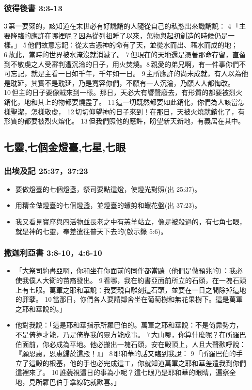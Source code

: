 \subsubsection{彼得後書 3:3-13}
 3 第一要緊的，該知道在末世必有好譏誚的人隨從自己的私慾出來譏誚說： 4 「主要降臨的應許在哪裡呢？因為從列祖睡了以來，萬物與起初創造的時候仍是一樣。」 5 他們故意忘記：從太古憑神的命有了天，並從水而出、藉水而成的地； 6 故此，當時的世界被水淹沒就消滅了。 7 但現在的天地還是憑著那命存留，直留到不敬虔之人受審判遭沉淪的日子，用火焚燒。8 親愛的弟兄啊，有一件事你們不可忘記，就是主看一日如千年，千年如一日。 9 主所應許的尚未成就，有人以為他是耽延，其實不是耽延，乃是寬容你們，不願有一人沉淪，乃願人人都悔改。 10 但主的日子要像賊來到一樣。那日，天必大有響聲廢去，有形質的都要被烈火銷化，地和其上的物都要燒盡了。 11 這一切既然都要如此銷化，你們為人該當怎樣聖潔，怎樣敬虔， 12 切切仰望神的日子來到！在\underline{那日}，天被火燒就銷化了，有形質的都要被烈火熔化。 13 但我們照他的應許，盼望新天新地，有義居在其中。






\subsection{七靈,七個金燈臺,七星,七眼}
\subsubsection{出埃及記 25:37，37:23}
\begin{itemize} 
\itemsep-.25em
\item 要做燈臺的七個燈盞，祭司要點這燈，使燈光對照(出 25:37)。
\item 用精金做燈臺的七個燈盞，並燈臺的蠟剪和蠟花盤(出 37:23)。
\item 我又看見寶座與四活物並長老之中有羔羊站立，像是被殺過的，有七角七眼，就是神的七靈，奉差遣往普天下去的(啟示錄 5:6)。
\end{itemize} 

\subsubsection{撒迦利亞書 3:8-10，4:6-10}
\begin{itemize} 
\itemsep-.25em
\item 「大祭司約書亞啊，你和坐在你面前的同伴都當聽（他們是做預兆的）：我必使我僕人大衛的苗裔發出。 9 看哪，我在約書亞面前所立的石頭，在一塊石頭上有七眼。萬軍之耶和華說：我要親自雕刻這石頭，並要在一日之間除掉這地的罪孽。 10 當那日，你們各人要請鄰舍坐在葡萄樹和無花果樹下。這是萬軍之耶和華說的。」
\item 他對我說：「這是耶和華指示所羅巴伯的。萬軍之耶和華說：不是倚靠勢力，不是倚靠才能，乃是倚靠我的靈方能成事。 7 大山哪，你算什麼呢？在所羅巴伯面前，你必成為平地。他必搬出一塊石頭，安在殿頂上，人且大聲歡呼說：『願恩惠，恩惠歸於這殿！』」 8 耶和華的話又臨到我說： 9 「所羅巴伯的手立了這殿的根基，他的手也必完成這工，你就知道萬軍之耶和華差遣我到你們這裡來了。 10 誰藐視這日的事為小呢？這七眼乃是耶和華的眼睛，遍察全地，見所羅巴伯手拿線砣就歡喜。」
\end{itemize} 

